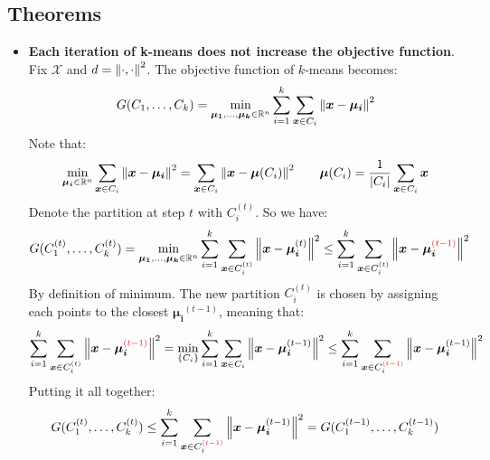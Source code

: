\documentclass[../template.tex]{subfiles}
\begin{document}
\subsection{Theorems}
\begin{itemize}
    \item \textbf{Each iteration of k-means does not increase the objective function}. Fix $\mathcal{X}$ and $d = \norm{\cdot, \cdot}^2$. The objective function of $k$-means becomes:
    \begin{align*}
        G(C_1, \dots, C_k) = \min_{\bm{\mu_1}, \dots, \bm{\mu_k} \in \mathbb{R}^n} \sum_{i=1}^k \sum_{\bm{x} \in C_i} \norm{\bm{x} - \bm{\mu_i}}^2
    \end{align*}
    Note that:
    \begin{align*}
        \min_{\bm{\mu_i} \in \mathbb{R}^n}\sum_{\bm{x} \in C_i} \norm{\bm{x}-\bm{\mu_i}}^2 = \sum_{\bm{x} \in C_i} \norm{\bm{x}-\bm{\mu}(C_i)}^2 \qquad \bm{\mu}(C_i) = \frac{1}{|C_i|}\sum_{\bm{x} \in C_i} \bm{x} 
    \end{align*}
    Denote the partition at step $t$ with $C_i^{(t)}$. So we have:
    \begin{align*}
        G(C_1^{(t)}, \dots, C_k^{(t)}) = \min_{\bm{\mu_1}, \dots, \bm{\mu_k} \in \mathbb{R}^n} \sum_{i=1}^k \sum_{\bm{x} \in C_i^{(t)}} \norm{\bm{x} - \bm{\mu_i}^{(t)}}^2 \leq\sum_{i=1}^k   \sum_{\bm{x} \in C_i^{(t)}} \norm{\bm{x} - \bm{\mu_i}^{\textcolor{Red}{(t-1)}}}^2 
    \end{align*}
    By definition of minimum. The new partition $C_i^{(t)}$ is chosen by assigning each points to the closest $\bm{\mu_i}^{(t-1)}$, meaning that:
    \begin{align*}
        \sum_{i=1}^k   \sum_{\bm{x} \in C_i^{(t)}} \norm{\bm{x} - \bm{\mu_i}^{\textcolor{Red}{(t-1)}}}^2 = \min_{\{C_i\}} \sum_{i=1}^k \sum_{\bm{x} \in C_i} \norm{\bm{x} - \bm{\mu_i}^{{(t-1)}}}^2 \leq \sum_{i=1}^k \sum_{\bm{x} \in C_i^{\textcolor{Red}{(t-1)}}} \norm{\bm{x} - \bm{\mu_i}^{(t-1)}}^2
    \end{align*}
    Putting it all together:
    \begin{align*}
        G(C_1^{(t)}, \dots, C_k^{(t)})  \leq\sum_{i=1}^k \sum_{\bm{x} \in C_i^{\textcolor{Red}{(t-1)}}} \norm{\bm{x} - \bm{\mu_i}^{(t-1)}}^2 = G(C_1^{(t-1)}, \dots, C_k^{(t-1)})
    \end{align*}
\end{itemize}
\end{document}
